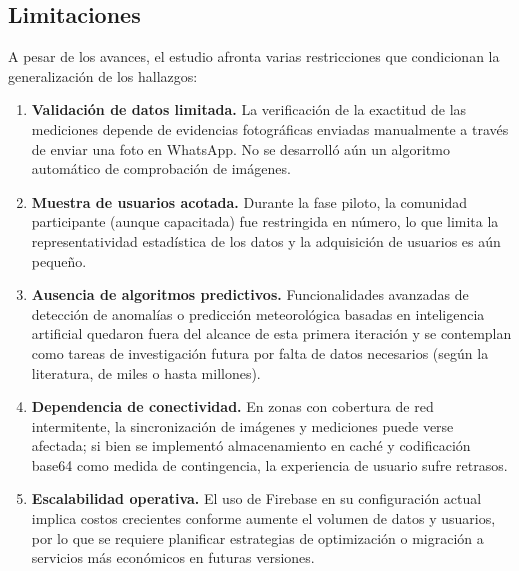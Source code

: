 \subsection{Limitaciones}

A pesar de los avances, el estudio afronta varias restricciones que condicionan la generalización de los hallazgos:

\begin{enumerate}
  \item \textbf{Validación de datos limitada.} La verificación de la exactitud de las mediciones depende de evidencias fotográficas enviadas manualmente a través de enviar una foto en WhatsApp. No se desarrolló aún un algoritmo automático de comprobación de imágenes.
  \item \textbf{Muestra de usuarios acotada.} Durante la fase piloto, la comunidad participante (aunque capacitada) fue restringida en número, lo que limita la representatividad estadística de los datos y la adquisición de usuarios es aún pequeño.
  \item \textbf{Ausencia de algoritmos predictivos.} Funcionalidades avanzadas de detección de anomalías o predicción meteorológica basadas en inteligencia artificial quedaron fuera del alcance de esta primera iteración y se contemplan como tareas de investigación futura por falta de datos necesarios (según la literatura, de miles o hasta millones).
  \item \textbf{Dependencia de conectividad.} En zonas con cobertura de red intermitente, la sincronización de imágenes y mediciones puede verse afectada; si bien se implementó almacenamiento en caché y codificación base64 como medida de contingencia, la experiencia de usuario sufre retrasos.
  \item \textbf{Escalabilidad operativa.} El uso de Firebase en su configuración actual implica costos crecientes conforme aumente el volumen de datos y usuarios, por lo que se requiere planificar estrategias de optimización o migración a servicios más económicos en futuras versiones.
\end{enumerate}
